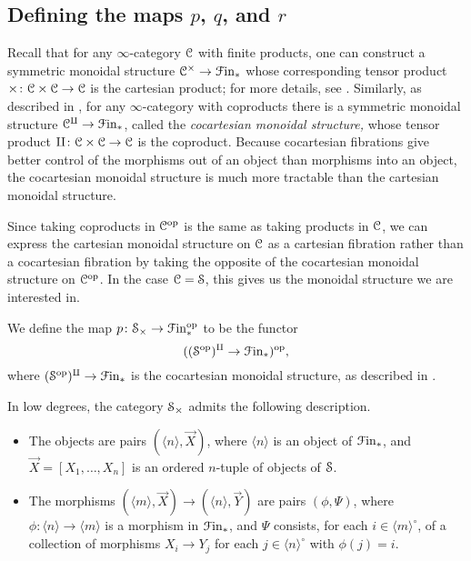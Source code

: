 \documentclass[main.tex]{subfiles}
\begin{document}
\subsection{Defining the maps \texorpdfstring{$p$}{p}, \texorpdfstring{$q$}{q}, and \texorpdfstring{$r$}{r}}
\label{ssc:defining_the_maps_p_q_and_r}

Recall that for any $\infty$-category $\category{C}$ with finite products, one can construct a symmetric monoidal structure $\category{C}^{\times} \to \Finp$ whose corresponding tensor product $\times\colon \category{C} \times \category{C} \to \category{C}$ is the cartesian product; for more details, see \cite[Sec.\ 2.4.1]{luriehigheralgebra}. Similarly, as described in \cite[Sec.\ 2.4.2]{luriehigheralgebra}, for any $\infty$-category with coproducts there is a symmetric monoidal structure $\category{C}^{\amalg} \to \Finp$, called the \emph{cocartesian monoidal structure,} whose tensor product $\amalg\colon \category{C} \times \category{C} \to \category{C}$ is the coproduct. Because cocartesian fibrations give better control of the morphisms out of an object than morphisms into an object, the cocartesian monoidal structure is much more tractable than the cartesian monoidal structure.

Since taking coproducts in $\category{C}\op$ is the same as taking products in $\category{C}$, we can express the cartesian monoidal structure on $\category{C}$ as a cartesian fibration rather than a cocartesian fibration by taking the opposite of the cocartesian monoidal structure on $\category{C}\op$. In the case $\category{C} = \S$, this gives us the monoidal structure we are interested in.

\begin{definition}
  We define the map $p\colon \S_{\times} \to \Finp\op$ to be the functor
  \begin{equation*}
    ((\S\op)^{\amalg} \to \Finp)\op,
  \end{equation*}
  where $(\S\op)^{\amalg} \to \Finp$ is the cocartesian monoidal structure, as described in \cite[Sec.\ 2.4.2]{luriehigheralgebra}.
\end{definition}

In low degrees, the category $\S_{\times}$ admits the following description.
\begin{itemize}
  \item The objects are pairs $(\langle n \rangle, \vec{X})$, where $\langle n \rangle$ is an object of $\Finp$, and $\vec{X} = [X_{1}, \ldots, X_{n}]$ is an ordered $n$-tuple of objects of $\S$.

  \item The morphisms $(\langle m \rangle, \vec{X}) \to (\langle n \rangle, \vec{Y})$ are pairs $(\phi, \Psi)$, where $\phi\colon \langle n \rangle \to \langle m \rangle$ is a morphism in $\Finp$, and $\Psi$ consists, for each $i \in \langle m \rangle^{\circ}$, of a collection of morphisms $X_{i} \to Y_{j}$ for each $j \in \langle n \rangle^{\circ}$ with $\phi(j) = i$.
\end{itemize}
\end{document}
